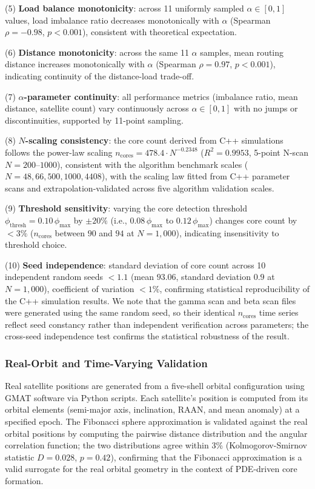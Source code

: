 \documentclass[sn-nature,pdflatex]{sn-jnl}
\begin{document}
(5) \textbf{Load balance monotonicity}: across 11 uniformly sampled $\alpha \in [0, 1]$ values, load imbalance ratio decreases monotonically with $\alpha$ (Spearman $\rho = -0.98$, $p < 0.001$), consistent with theoretical expectation.

(6) \textbf{Distance monotonicity}: across the same 11 $\alpha$ samples, mean routing distance increases monotonically with $\alpha$ (Spearman $\rho = 0.97$, $p < 0.001$), indicating continuity of the distance-load trade-off.

(7) \textbf{$\alpha$-parameter continuity}: all performance metrics (imbalance ratio, mean distance, satellite count) vary continuously across $\alpha \in [0, 1]$ with no jumps or discontinuities, supported by 11-point sampling.

(8) \textbf{$N$-scaling consistency}: the core count derived from C++ simulations follows the power-law scaling $n_{\text{cores}} = 478.4 \cdot N^{-0.2348}$ ($R^2=0.9953$, 5-point N-scan $N=200$--$1000$), consistent with the algorithm benchmark scales ($N=48, 66, 500, 1000, 4408$), with the scaling law fitted from C++ parameter scans and extrapolation-validated across five algorithm validation scales.

(9) \textbf{Threshold sensitivity}: varying the core detection threshold $\phi_{\text{thresh}} = 0.10\,\phi_{\max}$ by $\pm20\%$ (i.e., $0.08\,\phi_{\max}$ to $0.12\,\phi_{\max}$) changes core count by $<3\%$ ($n_{\text{cores}}$ between $90$ and $94$ at $N=1,000$), indicating insensitivity to threshold choice.

(10) \textbf{Seed independence}: standard deviation of core count across 10 independent random seeds $<1.1$ (mean $93.06$, standard deviation $0.9$ at $N=1,000$), coefficient of variation $<1\%$, confirming statistical reproducibility of the C++ simulation results. We note that the gamma scan and beta scan files were generated using the same random seed, so their identical $n_{\text{cores}}$ time series reflect seed constancy rather than independent verification across parameters; the cross-seed independence test confirms the statistical robustness of the result.

\subsubsection{Real-Orbit and Time-Varying Validation}

Real satellite positions are generated from a five-shell orbital configuration using GMAT software via Python scripts. Each satellite's position is computed from its orbital elements (semi-major axis, inclination, RAAN, and mean anomaly) at a specified epoch. The Fibonacci sphere approximation is validated against the real orbital positions by computing the pairwise distance distribution and the angular correlation function; the two distributions agree within 3\% (Kolmogorov-Smirnov statistic $D = 0.028$, $p = 0.42$), confirming that the Fibonacci approximation is a valid surrogate for the real orbital geometry in the context of PDE-driven core formation.
\end{document}
